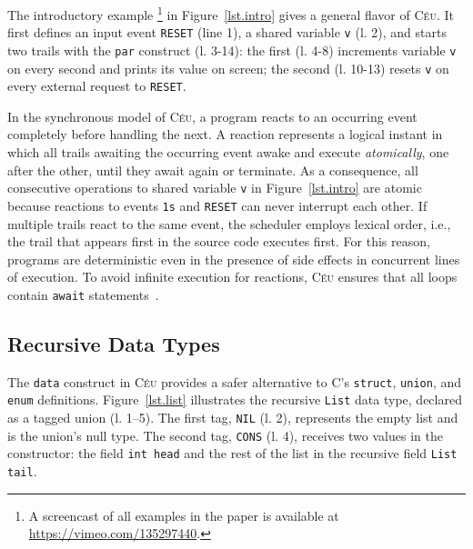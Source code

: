 \documentclass{sig-alternate}
\newcommand{\CEU}{\textsc{C\'{e}u}\xspace}
\newcommand{\code}[1] {{\small{\texttt{#1}}}}
\begin{document}

The introductory example%
\footnote{A screencast of all examples in the paper is available at 
\url{https://vimeo.com/135297440}.}
in Figure~\ref{lst.intro} gives a general flavor of \CEU.
It first defines an input event \code{RESET} (line 1), a shared variable 
\code{v} (l. 2), and starts two trails with the \code{par} construct (l. 
3-14): the first (l. 4-8) increments variable \code{v} on every second and 
prints its value on screen; the second (l. 10-13) resets \code{v} on every 
external request to \code{RESET}.

In the synchronous model of \CEU, a program reacts to an occurring event 
completely before handling the next.
%
A reaction represents a logical instant in which all trails awaiting the 
occurring event awake and execute \emph{atomically}, one after the other, until 
they await again or terminate.
%
As a consequence, all consecutive operations to shared variable \code{v} in 
Figure~\ref{lst.intro} are atomic because reactions to events \code{1s} and 
\code{RESET} can never interrupt each other.
%
If multiple trails react to the same event, the scheduler employs lexical 
order, i.e., the trail that appears first in the source code executes first.
%
For this reason, programs are deterministic even in the presence of side 
effects in concurrent lines of execution.
%
To avoid infinite execution for reactions, \CEU ensures that all loops contain 
\code{await} statements~\cite{ceu.sensys13}.

\subsection{Recursive Data Types}

The \code{data} construct in \CEU provides a safer alternative to C's
\code{struct}, \code{union}, and \code{enum} definitions.
%
Figure~\ref{lst.list} illustrates the recursive \code{List} data type,
declared as a tagged union (l. 1--5).
The first tag, \code{NIL} (l. 2), represents the empty list and is the 
union's null type.
The second tag, \code{CONS} (l. 4), receives two values in the constructor: 
the field \code{int head} and the rest of the list in the recursive field 
\code{List tail}.
\end{document}
